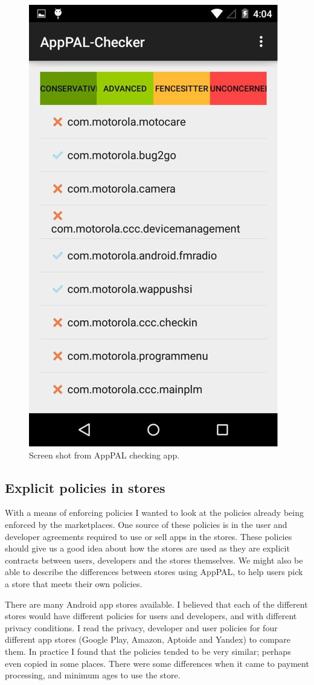 \documentclass[a4paper]{scrartcl}
\begin{document}
\begin{figure}[]
  \centering
  \includegraphics[width=0.5\linewidth]{images/apppal-checker.png}
  \caption{Screen shot from AppPAL checking app.}
  \label{fig:checker}
\end{figure}
\subsection{Explicit policies in stores}

With a means of enforcing policies I wanted to look at the policies already being enforced by the marketplaces.
One source of these policies is in the user and developer agreements required to use or sell apps in the stores.
These policies should give us a good idea about how the stores are used as they are explicit contracts between users, developers and the stores themselves.
We might also be able to describe the differences between stores using AppPAL, to help users pick a store that meets their own policies.

There are many Android app stores available.
I believed that each of the different stores would have different policies for users and developers, and with different privacy conditions.
I read the privacy, developer and user policies for four different app stores (Google Play, Amazon, Aptoide and Yandex) to compare them.
In practice I found that the policies tended to be very similar; perhaps even copied in some places.
There were some differences when it came to payment processing, and minimum ages to use the store.
\end{document}
